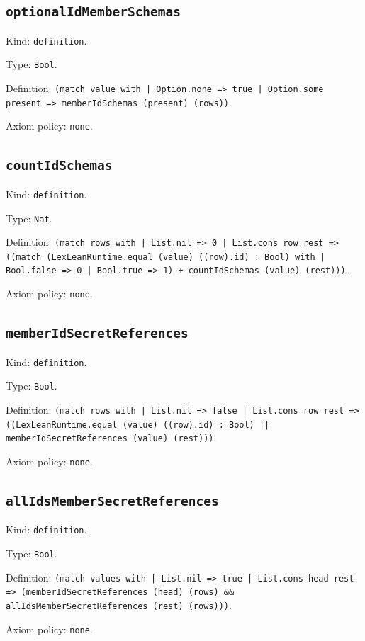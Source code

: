 \documentclass[11pt]{article}
\begin{document}
\subsection*{\texttt{optionalIdMemberSchemas}}
\noindent Kind: \texttt{definition}.\par
\noindent Type: \texttt{Bool}.\par
\noindent Definition: \texttt{(match value with | Option.none => true | Option.some present => memberIdSchemas (present) (rows))}.\par
\noindent Axiom policy: \texttt{none}.\par
\subsection*{\texttt{countIdSchemas}}
\noindent Kind: \texttt{definition}.\par
\noindent Type: \texttt{Nat}.\par
\noindent Definition: \texttt{(match rows with | List.nil => 0 | List.cons row rest => ((match (LexLeanRuntime.equal (value) ((row).id) : Bool) with | Bool.false => 0 | Bool.true => 1) + countIdSchemas (value) (rest)))}.\par
\noindent Axiom policy: \texttt{none}.\par
\subsection*{\texttt{memberIdSecretReferences}}
\noindent Kind: \texttt{definition}.\par
\noindent Type: \texttt{Bool}.\par
\noindent Definition: \texttt{(match rows with | List.nil => false | List.cons row rest => ((LexLeanRuntime.equal (value) ((row).id) : Bool) || memberIdSecretReferences (value) (rest)))}.\par
\noindent Axiom policy: \texttt{none}.\par
\subsection*{\texttt{allIdsMemberSecretReferences}}
\noindent Kind: \texttt{definition}.\par
\noindent Type: \texttt{Bool}.\par
\noindent Definition: \texttt{(match values with | List.nil => true | List.cons head rest => (memberIdSecretReferences (head) (rows) \&\& allIdsMemberSecretReferences (rest) (rows)))}.\par
\noindent Axiom policy: \texttt{none}.\par
\end{document}

